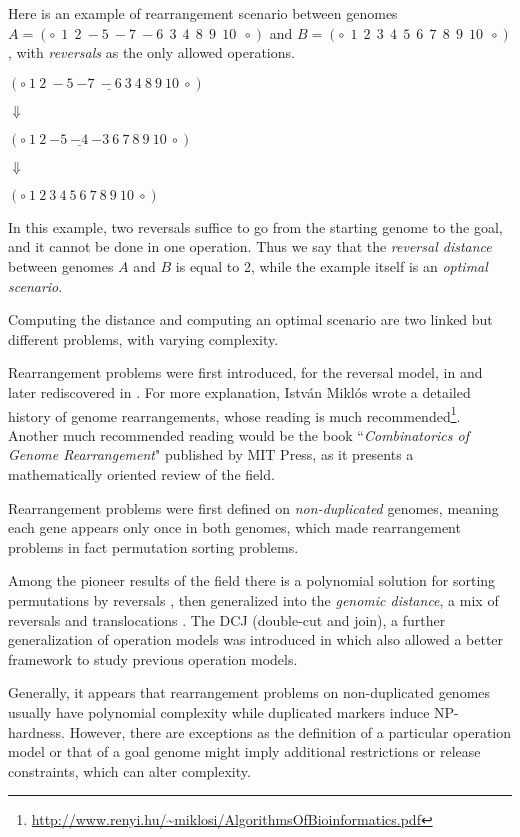 \documentclass[11pt,final,twoside,nofrench]{thlifl}
\newcommand{\mfst}[1]{ \ensuremath{{- #1}} }
\begin{document}
Here is an example of rearrangement scenario between genomes $A = (\circ~~1~~2~-5~-7~-6~~3~~4~~8~~9~~10~~\circ)$ and $B = (\circ~~1~~2~~3~~4~~5~~6~~7~~8~~9~~10~~\circ)$, with \emph{reversals} as the only allowed operations.

\begin{center}
$(\circ~1~2~-5~\underline{-7~-6~3~4}~8~9~10~\circ)$

$\Downarrow$

$(\circ~1~2~\underline{\mfst{5}~\mfst{4}~\mfst{3}}~6~7~8~9~10~\circ)$

$\Downarrow$

$(\circ~1~2~3~4~5~6~7~8~9~10~\circ)$

\end{center}

In this example, two reversals suffice to go from the starting genome to the goal, and it cannot be done in one operation. Thus we say that the \emph{reversal distance} between genomes $A$ and $B$ is equal to 2, while the example itself is an \emph{optimal scenario}.

Computing the distance and computing an optimal scenario are two linked but different problems, with varying complexity.

\clearpage

Rearrangement problems were first introduced, for the reversal model, in \cite{S21} \cite{S41} and later rediscovered in \cite{PH88}. For more explanation, István Miklós wrote a detailed history of genome rearrangements, whose reading is much recommended\footnote{\url{http://www.renyi.hu/~miklosi/AlgorithmsOfBioinformatics.pdf}}. Another much recommended reading would be the book ``\textit{Combinatorics of Genome Rearrangement}" published by MIT Press, as it presents a mathematically oriented review of the field.

Rearrangement problems were first defined on \emph{non-duplicated} genomes, meaning each gene appears only once in both genomes, which made rearrangement problems in fact permutation sorting problems.

Among the pioneer results of the field there is a polynomial solution for sorting permutations by reversals \cite{HP95}, then generalized into the \emph{genomic distance}, a mix of reversals and translocations \cite{HP95bis}. The DCJ (double-cut and join), a further generalization of operation models was introduced in \cite{Yancopoulos05} which also allowed a better framework to study previous operation models.

Generally, it appears that rearrangement problems on non-duplicated genomes usually have polynomial complexity while duplicated markers induce NP-hardness. However, there are exceptions as the definition of a particular operation model or that of a goal genome might imply additional restrictions or release constraints, which can alter complexity.
\end{document}
